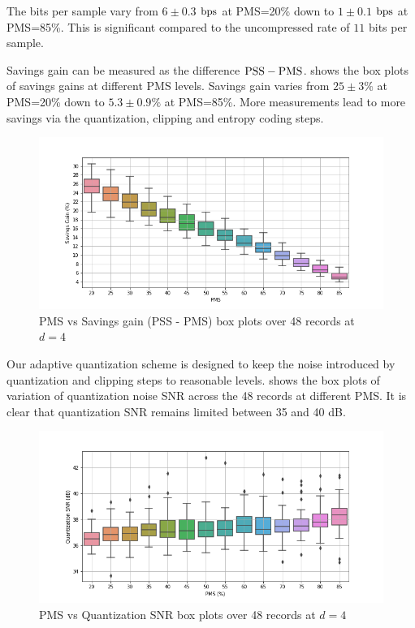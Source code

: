 The bits per sample vary from
$6 \pm 0.3$ $\mathrm{bps}$ at PMS=20\% down to
$1 \pm 0.1$ $\mathrm{bps}$ at PMS=85\%.
This is significant compared to the uncompressed
rate of $11$ bits per sample.

Savings gain can be measured as the difference $\mathrm{PSS} - \mathrm{PMS}$.
 shows the box plots of
savings gains at different PMS levels.
Savings gain varies from $25\pm3\%$ at PMS=20\% down to
$5.3 \pm 0.9\%$ at PMS=85\%. More measurements lead to
more savings via the quantization, clipping and entropy coding steps.


\begin{figure}
\centering
\includegraphics[width=0.95\linewidth]{images/bsbl/pms-vs-saving-gain-boxplot.png}
\caption{PMS vs Savings gain (PSS - PMS) box plots over 48 records at $d=4$}
\label{fig-res-pms-gain-boxplot-d4}
\end{figure}

Our adaptive quantization scheme is designed to
keep the noise introduced by quantization and clipping
steps to reasonable levels.
 shows the box plots
of variation of quantization noise SNR across the 48
records at different PMS. It is clear that quantization
SNR remains limited between 35 and 40 dB.

\begin{figure}
\centering
\includegraphics[width=0.95\linewidth]{images/bsbl/pms-vs-q-snr-boxplot-d4.png}
\caption{PMS vs Quantization SNR box plots over 48 records at $d=4$}
\label{fig-res-pms-q-snr-boxplot-d4}
\end{figure}


